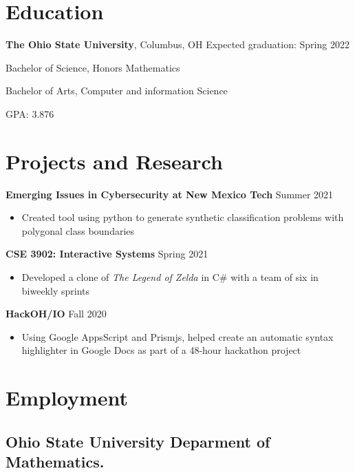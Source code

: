 \documentclass[10pt,sans]{moderncv}
\begin{document}
\maketitle

\section*{Education}

\textbf{The Ohio State University}, Columbus, OH \hfill Expected graduation: Spring 2022

Bachelor of Science, Honors Mathematics

Bachelor of Arts, Computer and information Science

GPA: 3.876

\section*{Projects and Research}

\textbf{Emerging Issues in Cybersecurity at New Mexico Tech} \hfill Summer 2021
\begin{itemize}
    \item Created tool using python to generate synthetic classification problems with polygonal class boundaries
\end{itemize}

\textbf{CSE 3902: Interactive Systems} \hfill Spring 2021
\begin{itemize}
    \item Developed a clone of \textit{The Legend of Zelda} in C\# with a team of six in biweekly sprints
\end{itemize}

\textbf{HackOH/IO} \hfill Fall 2020
\begin{itemize}
    \item Using Google AppsScript and Prismjs, helped create an automatic syntax highlighter in Google Docs as part of a
    48-hour hackathon project
\end{itemize}

\section*{Employment}

\subsection*{Ohio State University Deparment of Mathematics.}
\end{document}
